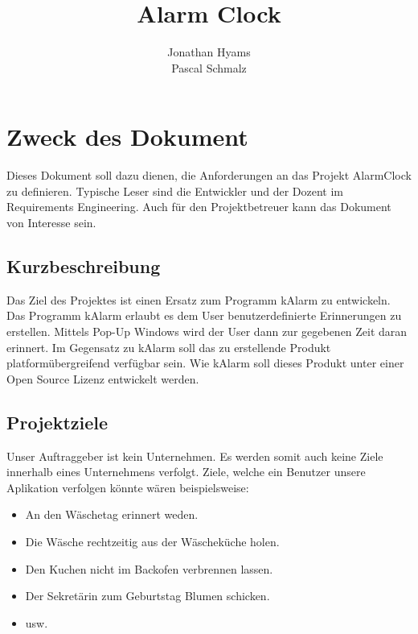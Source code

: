 \documentclass[11pt,titelpage]{scrartcl}
\title{Alarm Clock }
\author{Jonathan Hyams \\Pascal Schmalz}
\begin{document}
\thispagestyle{empty}
\maketitle
\tableofcontents

\pagestyle{fancy}


\begin{abstract}
\end{abstract}
\chapter{Zweck des Dokument}
Dieses Dokument soll dazu dienen, die Anforderungen an das Projekt AlarmClock zu definieren. Typische Leser sind die
Entwickler und der Dozent im Requirements Engineering. Auch für den Projektbetreuer kann das Dokument von Interesse sein.

\section{Kurzbeschreibung}
Das Ziel des Projektes ist einen Ersatz zum Programm kAlarm zu entwickeln.
Das Programm kAlarm erlaubt es dem User benutzerdefinierte Erinnerungen zu erstellen. Mittels Pop-Up Windows wird der
User dann zur gegebenen Zeit daran erinnert. Im Gegensatz zu kAlarm soll das zu erstellende Produkt
platformübergreifend verfügbar sein. Wie kAlarm soll dieses Produkt unter einer Open Source Lizenz entwickelt werden.

\section{Projektziele}
Unser Auftraggeber ist kein Unternehmen. Es werden somit auch keine Ziele innerhalb eines Unternehmens verfolgt.
Ziele, welche ein Benutzer unsere Aplikation verfolgen könnte wären beispielsweise:
\begin{itemize}
 \item An den Wäschetag erinnert weden.
 \item Die Wäsche rechtzeitig aus der Wäscheküche holen.
 \item Den Kuchen nicht im Backofen verbrennen lassen.
 \item Der Sekretärin zum Geburtstag Blumen schicken.
 \item usw.

\end{itemize}
\end{document}
